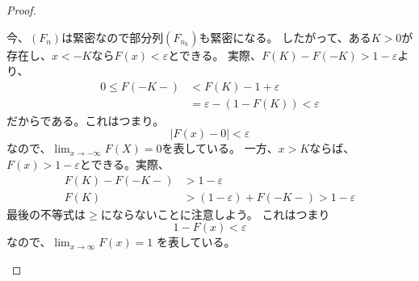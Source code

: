 \begin{proof}
\begin{description}
        今、$(F_n)$は緊密なので部分列$(F_{n_k})$も緊密になる。
        したがって、ある$K > 0$が存在し、$x < -K$なら$F(x) < \varepsilon$とできる。
        実際、$F(K) - F(-K) > 1 - \varepsilon$より、
        \begin{align*}
          0 \leq F(-K-) &< F(K) - 1 + \varepsilon\\
          &= \varepsilon - ( 1 - F(K)) < \varepsilon
        \end{align*}
        だからである。これはつまり。
        \[
          |F(x) - 0| < \varepsilon
        \]
        なので、$\lim_{x \to -\infty}F(X) = 0$を表している。
        一方、$x > K$ならば、$F(x) > 1 - \varepsilon$とできる。実際、
        \begin{align*}
          F(K) - F(-K-) &> 1 - \varepsilon\\
          F(K) &> (1 - \varepsilon) + F(-K-) > 1 - \varepsilon
        \end{align*}
        最後の不等式は$\ge$にならないことに注意しよう。
        これはつまり
        \[
          1 - F(x) < \varepsilon
        \]
        なので、$\lim_{x \to \infty}F(x) = 1$
        を表している。
      \end{description}
    \end{proof}

